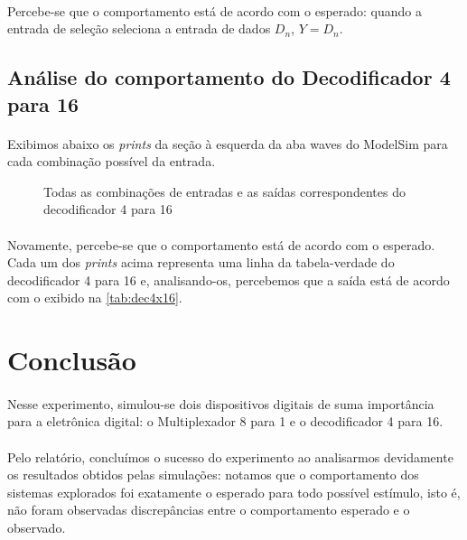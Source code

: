 \documentclass[a4paper,12pt]{article}
\begin{document}
\paragraph{}
Percebe-se que o comportamento está de acordo com o esperado: quando a entrada de seleção seleciona a entrada de dados $D_n$, $Y=D_n$.

\subsection{Análise do comportamento do Decodificador 4 para 16}

\paragraph{}
Exibimos abaixo os \textit{prints} da seção à esquerda da aba waves do ModelSim para cada combinação possível da entrada.

\begin{figure}[H]
    \centering
    
    \caption{Todas as combinações de entradas e as saídas correspondentes do decodificador 4 para 16}
    \vspace{-15pt}
\end{figure}

\paragraph{}
Novamente, percebe-se que o comportamento está de acordo com o esperado. Cada um dos \textit{prints} acima representa uma linha da tabela-verdade do decodificador 4 para 16 e, analisando-os, percebemos que a saída está de acordo com o exibido na \autoref{tab:dec4x16}.

\section{Conclusão}

\paragraph{}
Nesse experimento, simulou-se dois dispositivos digitais de suma importância para a eletrônica digital: o Multiplexador 8 para 1 e o decodificador 4 para 16.

\paragraph{}
Pelo relatório, concluímos o sucesso do experimento ao analisarmos devidamente os resultados obtidos pelas simulações: notamos que o comportamento dos sistemas explorados foi exatamente o esperado para todo possível estímulo, isto é, não foram observadas discrepâncias entre o comportamento esperado e o observado.
\end{document}
